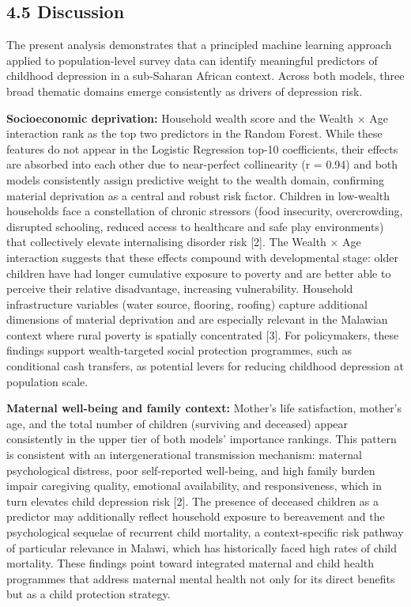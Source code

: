 \documentclass[11pt]{article}
\begin{document}
    \hypertarget{discussion}{%
\subsection{4.5 Discussion}\label{discussion}}

The present analysis demonstrates that a principled machine learning
approach applied to population-level survey data can identify meaningful
predictors of childhood depression in a sub-Saharan African context.
Across both models, three broad thematic domains emerge consistently as
drivers of depression risk.

\textbf{Socioeconomic deprivation:} Household wealth score and the
Wealth × Age interaction rank as the top two predictors in the Random
Forest. While these features do not appear in the Logistic Regression
top-10 coefficients, their effects are absorbed into each other due to
near-perfect collinearity (r = 0.94) and both models consistently assign
predictive weight to the wealth domain, confirming material deprivation
as a central and robust risk factor. Children in low-wealth households
face a constellation of chronic stressors (food insecurity,
overcrowding, disrupted schooling, reduced access to healthcare and safe
play environments) that collectively elevate internalising disorder risk
{[}2{]}. The Wealth × Age interaction suggests that these effects
compound with developmental stage: older children have had longer
cumulative exposure to poverty and are better able to perceive their
relative disadvantage, increasing vulnerability. Household
infrastructure variables (water source, flooring, roofing) capture
additional dimensions of material deprivation and are especially
relevant in the Malawian context where rural poverty is spatially
concentrated {[}3{]}. For policymakers, these findings support
wealth-targeted social protection programmes, such as conditional cash
transfers, as potential levers for reducing childhood depression at
population scale.

\textbf{Maternal well-being and family context:} Mother's life
satisfaction, mother's age, and the total number of children (surviving
and deceased) appear consistently in the upper tier of both models'
importance rankings. This pattern is consistent with an
intergenerational transmission mechanism: maternal psychological
distress, poor self-reported well-being, and high family burden impair
caregiving quality, emotional availability, and responsiveness, which in
turn elevates child depression risk {[}2{]}. The presence of deceased
children as a predictor may additionally reflect household exposure to
bereavement and the psychological sequelae of recurrent child mortality,
a context-specific risk pathway of particular relevance in Malawi, which
has historically faced high rates of child mortality. These findings
point toward integrated maternal and child health programmes that
address maternal mental health not only for its direct benefits but as a
child protection strategy.
\end{document}
